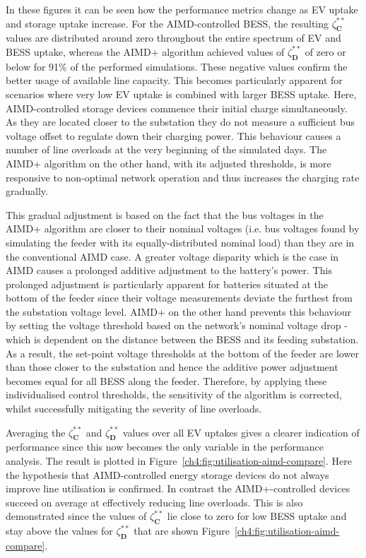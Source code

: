 In these figures it can be seen how the performance metrics change as EV uptake and storage uptake increase.
For the AIMD-controlled BESS, the resulting $\zeta_\textbf{C}^{**}$ values are distributed around zero throughout the entire spectrum of EV and BESS uptake, whereas the AIMD+ algorithm achieved values of $\zeta_\textbf{D}^{**}$ of zero or below for 91\% of the performed simulations.
These negative values confirm the better usage of available line capacity.
This becomes particularly apparent for scenarios where very low EV uptake is combined with larger BESS uptake.
Here, AIMD-controlled storage devices commence their initial charge simultaneously.
As they are located closer to the substation they do not measure a sufficient bus voltage offset to regulate down their charging power.
This behaviour causes a number of line overloads at the very beginning of the simulated days.
The AIMD+ algorithm on the other hand, with its adjusted thresholds, is more responsive to non-optimal network operation and thus increases the charging rate gradually.



This gradual adjustment is based on the fact that the bus voltages in the AIMD+ algorithm are closer to their nominal voltages (i.e. bus voltages found by simulating the feeder with its equally-distributed nominal load) than they are in the conventional AIMD case.
A greater voltage disparity which is the case in AIMD causes a prolonged additive adjustment to the battery's power.
This prolonged adjustment is particularly apparent for batteries situated at the bottom of the feeder since their voltage measurements deviate the furthest from the substation voltage level.
AIMD+ on the other hand prevents this behaviour by setting the voltage threshold based on the network's nominal voltage drop - which is dependent on the distance between the BESS and its feeding substation.
As a result, the set-point voltage thresholds at the bottom of the feeder are lower than those closer to the substation and hence the additive power adjustment becomes equal for all BESS along the feeder.
Therefore, by applying these individualised control thresholds, the sensitivity of the algorithm is corrected, whilst successfully mitigating the severity of line overloads.

Averaging the $\zeta_\textbf{C}^{**}$ and $\zeta_\textbf{D}^{**}$ values over all EV uptakes gives a clearer indication of performance since this now becomes the only variable in the performance analysis.
The result is plotted in Figure~\ref{ch4:fig:utilisation-aimd-compare}.
Here the hypothesis that AIMD-controlled energy storage devices do not always improve line utilisation is confirmed.
In contrast the AIMD+-controlled devices succeed on average at effectively reducing line overloads.
This is also demonstrated since the values of $\zeta_\textbf{C}^{**}$ lie close to zero for low BESS uptake and stay above the values for $\zeta_\textbf{D}^{**}$  that are shown Figure~\ref{ch4:fig:utilisation-aimd-compare}.

